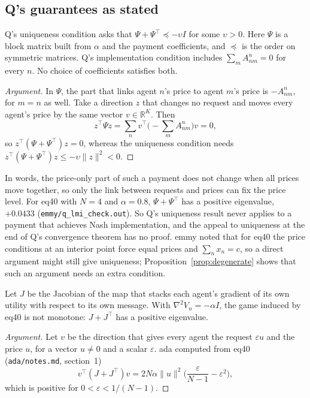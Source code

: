 \documentclass{article}
\begin{document}
\subsection{Q's guarantees as stated}\label{sec:audit}

\begin{proposition}\label{prop:lmi}
Q's uniqueness condition asks that \(\Psi+\Psi^\top\preceq-\upsilon I\) for some \(\upsilon>0\).
Here \(\Psi\) is a block matrix built from \(\alpha\) and the payment coefficients, and \(\preceq\) is the order on symmetric matrices.
Q's implementation condition includes \(\sum_mA^n_{nm}=0\) for every \(n\).
No choice of coefficients satisfies both.
\end{proposition}

\begin{proof}[Argument]
In \(\Psi\), the part that links agent \(n\)'s price to agent \(m\)'s price is \(-A^n_{nm}\), for \(m=n\) as well.
Take a direction \(z\) that changes no request and moves every agent's price by the same vector \(v\in\mathbb{R}^K\). Then
\[
z^\top\Psi z=\sum_n v^\top\Big(-\sum_mA^n_{nm}\Big)v=0,
\]
so \(z^\top(\Psi+\Psi^\top)z=0\), whereas the uniqueness condition needs \(z^\top(\Psi+\Psi^\top)z\le-\upsilon\|z\|^2<0\).
\end{proof}

In words, the price-only part of such a payment does not change when all prices move together, so only the link between requests and prices can fix the price level.
For eq40 with \(N=4\) and \(\alpha=0.8\), \(\Psi+\Psi^\top\) has a positive eigenvalue, \(+0.0433\) (\texttt{emmy/q\_lmi\_check.out}).
So Q's uniqueness result never applies to a payment that achieves Nash implementation, and the appeal to uniqueness at the end of Q's convergence theorem has no proof.
emmy noted that for eq40 the price conditions at an interior point force equal prices and \(\sum_nx_n=c\), so a direct argument might still give uniqueness; Proposition~\ref{prop:degenerate} shows that such an argument needs an extra condition.

\begin{proposition}\label{prop:monotone}
Let \(J\) be the Jacobian of the map that stacks each agent's gradient of its own utility with respect to its own message.
With \(\nabla^2V_n=-\alpha I\), the game induced by eq40 is not monotone: \(J+J^\top\) has a positive eigenvalue.
\end{proposition}

\begin{proof}[Argument]
Let \(v\) be the direction that gives every agent the request \(\varepsilon u\) and the price \(u\), for a vector \(u\ne0\) and a scalar \(\varepsilon\). ada computed from eq40 (\texttt{ada/notes.md}, section~1)
\[
v^\top(J+J^\top)v=2N\alpha\|u\|^2\Big(\frac{\varepsilon}{N-1}-\varepsilon^2\Big),
\]
which is positive for \(0<\varepsilon<1/(N-1)\).
\end{proof}
\end{document}
